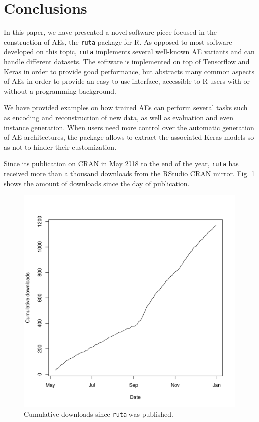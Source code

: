 

\section{Conclusions}
\label{p2sec.conclusions}


In this paper, we have presented a novel software piece focused in the construction of AEs, the \texttt{ruta} package for R. As opposed to most software developed on this topic, \texttt{ruta} implements several well-known AE variants and can handle different datasets. The software is implemented on top of Tensorflow and Keras in order to provide good performance{, but abstracts many common aspects of AEs in order to provide an easy-to-use interface, accessible to R users with or without a programming background}.

We have provided examples on how trained AEs can perform several tasks such as encoding and reconstruction of new data, as well as evaluation and even instance generation. {When users need more control over the automatic generation of AE architectures, the package allows to extract the associated Keras models so as not to hinder their customization.}

{Since its publication on CRAN in May 2018 to the end of the year, \texttt{ruta} has received more than a thousand downloads from the RStudio CRAN mirror. Fig. \ref{p2fig.downloads} shows the amount of downloads since the day of publication.}

\begin{figure}[ht]
  \centering
  \includegraphics[width=.5\textwidth]{ruta_downloads.pdf}
  \caption{\label{p2fig.downloads}Cumulative downloads since \texttt{ruta} was published.}
\end{figure}

